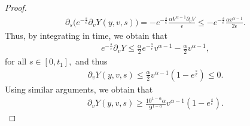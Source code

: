 \documentclass[10pt,a4paper]{amsart}
\begin{document}
\begin{proof}
\begin{align*}
             \partial_{s}\big(e^{-\frac{s}{\epsilon}}\partial_{v}Y(y,v,s)\big)=-e^{-\frac{s}{\epsilon}}\frac{\alpha V^{\alpha-1}\partial_{v}V}{\epsilon}\leq -e^{-\frac{s}{\epsilon}}\frac{\alpha v^{\alpha-1}}{2\epsilon}.
     \end{align*}
     Thus, by integrating in time, we obtain that
     \begin{align*}
         e^{-\frac{s}{\epsilon}}\partial_{v}Y\leq \frac{\alpha}{2} e^{-\frac{s}{\epsilon}}v^{\alpha-1}-\frac{\alpha}{2} v^{\alpha-1},
     \end{align*}
     for all $s\in[0,t_{1}],$ and thus
     \begin{align*}
         \partial_{v}Y(y,v,s)\leq \frac{\alpha}{2} v^{\alpha-1}(1-e^{\frac{s}{\epsilon}})\leq 0.
     \end{align*}
Using similar arguments, we obtain that
\begin{align}\label{exponential bound for der y}
    \partial_{v}Y(y,v,s)\geq \frac{10^{1-\alpha}\alpha}{9^{1-\alpha}} v^{\alpha-1}(1-e^{\frac{s}{\epsilon}}).
\end{align}


\end{proof}
\end{document}
